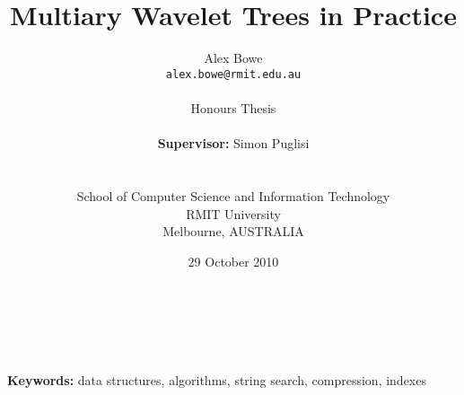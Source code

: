 \documentclass[a4paper]{article}
\begin{document}
\title{Multiary Wavelet Trees in Practice}
\author{Alex Bowe\\
\texttt{alex.bowe@rmit.edu.au} \\ \\
Honours Thesis \\ \\
\textbf{Supervisor:} Simon Puglisi\\ \\ \\
School of Computer Science and Information Technology \\
RMIT University\\
Melbourne, AUSTRALIA}

\date{29 October 2010}

\maketitle

\begin{abstract}
 \\ \\
\end{abstract}

\textbf{Keywords:} data structures, algorithms, string search, compression, indexes

%

\newpage
\tableofcontents
\newpage





%









%



\end{document}
